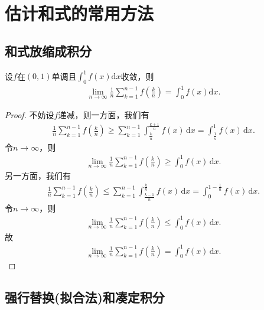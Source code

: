 \documentclass[../../main.tex]{subfiles}
\begin{document}
\section{估计和式的常用方法}

\subsection{和式放缩成积分}

\begin{proposition}
设\(f\)在\((0,1)\)单调且\(\int_{0}^{1} f(x) \mathrm{d}x\)收敛，则
\begin{align*}
\lim_{n \to \infty} \frac{1}{n} \sum_{k = 1}^{n - 1} f\left(\frac{k}{n}\right) = \int_{0}^{1} f(x)\mathrm{d}x.
\end{align*}
\end{proposition}
\begin{proof}
不妨设\(f\)递减，则一方面，我们有
\begin{align*}
\frac{1}{n}\sum_{k=1}^{n-1}f\left(\frac{k}{n}\right) \geqslant \sum_{k=1}^{n-1}\int_{\frac{k}{n}}^{\frac{k+1}{n}}f(x) \, \mathrm{d}x = \int_{\frac{1}{n}}^1 f(x) \, \mathrm{d}x.
\end{align*}
令\(n \to \infty\)，则
\begin{align*}
\lim_{n \to \infty} \frac{1}{n}\sum_{k=1}^{n-1}f\left(\frac{k}{n}\right) \geqslant \int_0^1 f(x) \, \mathrm{d}x.
\end{align*}
另一方面，我们有
\begin{align*}
\frac{1}{n}\sum_{k=1}^{n-1}f\left(\frac{k}{n}\right) \leqslant \sum_{k=1}^{n-1}\int_{\frac{k-1}{n}}^{\frac{k}{n}}f(x) \, \mathrm{d}x = \int_{0}^{1-\frac{1}{n}} f(x) \, \mathrm{d}x.
\end{align*}
令\(n \to \infty\)，则
\begin{align*}
\lim_{n \to \infty} \frac{1}{n}\sum_{k=1}^{n-1}f\left(\frac{k}{n}\right) \leqslant \int_0^1 f(x) \, \mathrm{d}x.
\end{align*}
故
\begin{align*}
\lim_{n \to \infty} \frac{1}{n}\sum_{k=1}^{n-1}f\left(\frac{k}{n}\right) = \int_0^1 f(x) \, \mathrm{d}x.
\end{align*}
\end{proof}

\subsection{强行替换(拟合法)和凑定积分}\label{强行替换(拟合法)和凑定积分}
\end{document}
